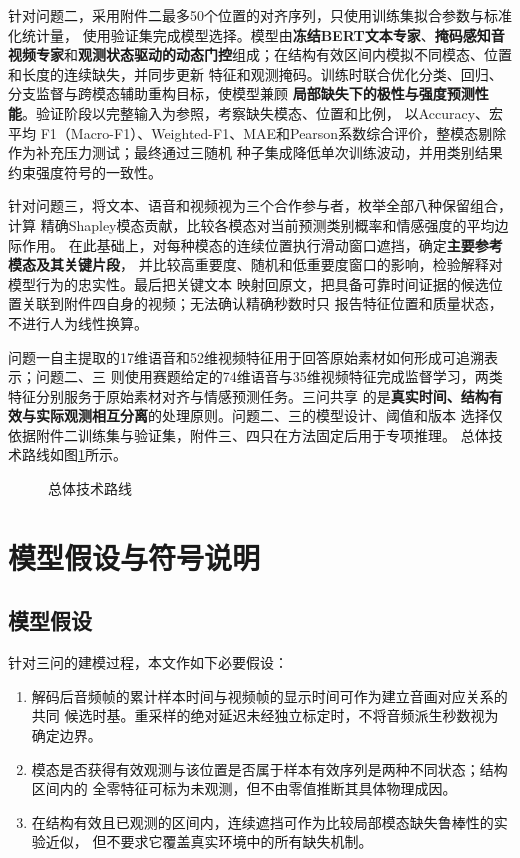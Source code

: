 \documentclass[bwprint]{gmcmthesis}
\begin{document}
针对问题二，采用附件二最多50个位置的对齐序列，只使用训练集拟合参数与标准化统计量，
使用验证集完成模型选择。模型由\textbf{冻结BERT文本专家}、\textbf{掩码感知音视频专家}和\textbf{观测状态驱动的动态门控}组成；在结构有效区间内模拟不同模态、位置和长度的连续缺失，并同步更新
特征和观测掩码。训练时联合优化分类、回归、分支监督与跨模态辅助重构目标，使模型兼顾
\textbf{局部缺失下的极性与强度预测性能}。验证阶段以完整输入为参照，考察缺失模态、位置和比例，
以Accuracy、宏平均 F1（Macro-F1）、Weighted-F1、MAE和Pearson系数综合评价，整模态剔除作为补充压力测试；最终通过三随机
种子集成降低单次训练波动，并用类别结果约束强度符号的一致性。

针对问题三，将文本、语音和视频视为三个合作参与者，枚举全部八种保留组合，计算
精确Shapley模态贡献，比较各模态对当前预测类别概率和情感强度的平均边际作用。
在此基础上，对每种模态的连续位置执行滑动窗口遮挡，确定\textbf{主要参考模态及其关键片段}，
并比较高重要度、随机和低重要度窗口的影响，检验解释对模型行为的忠实性。最后把关键文本
映射回原文，把具备可靠时间证据的候选位置关联到附件四自身的视频；无法确认精确秒数时只
报告特征位置和质量状态，不进行人为线性换算。

问题一自主提取的17维语音和52维视频特征用于回答原始素材如何形成可追溯表示；问题二、三
则使用赛题给定的74维语音与35维视频特征完成监督学习，两类特征分别服务于原始素材对齐与情感预测任务。三问共享
的是\textbf{真实时间、结构有效与实际观测相互分离}的处理原则。问题二、三的模型设计、阈值和版本
选择仅依据附件二训练集与验证集，附件三、四只在方法固定后用于专项推理。
总体技术路线如图\ref{fig:overall-flowchart}所示。

\begin{figure}[htbp]
 \centering
 \resizebox{\linewidth}{!}{}
 \caption{总体技术路线}
 \label{fig:overall-flowchart}
\end{figure}

\section{模型假设与符号说明}
\label{sec:assumptions}

\subsection{模型假设}

针对三问的建模过程，本文作如下必要假设：

\begin{enumerate}[label=\arabic*.]
 \item 解码后音频帧的累计样本时间与视频帧的显示时间可作为建立音画对应关系的共同
 候选时基。重采样的绝对延迟未经独立标定时，不将音频派生秒数视为确定边界。
 \item 模态是否获得有效观测与该位置是否属于样本有效序列是两种不同状态；结构区间内的
 全零特征可标为未观测，但不由零值推断其具体物理成因。
 \item 在结构有效且已观测的区间内，连续遮挡可作为比较局部模态缺失鲁棒性的实验近似，
 但不要求它覆盖真实环境中的所有缺失机制。
\end{enumerate}
\end{document}
